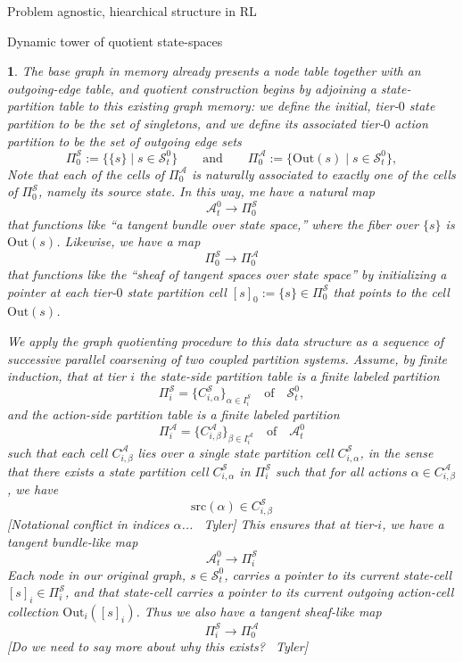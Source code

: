 \documentclass[11pt]{article}
\newtheorem{ermark}[subsubsection]{}
\begin{document}
\begin{section}{Problem agnostic, hiearchical structure in RL}
\begin{subsection}{Dynamic tower of quotient state-spaces}
\begin{ermark}
The base graph in memory already presents a node table together with an outgoing-edge table, and quotient construction begins by adjoining a state-partition table to this existing graph memory: we define the initial, {\em tier-}$0$ {\em state partition} to be the set of singletons, and we define its  associated {\em tier-}$0$ {\em action partition} to be the set of outgoing edge sets 
$$
\Pi_0^{\mathcal S}:=\bigl\{\{s\}\mid s\in\mathcal{S}_t^0\bigr\}
\qquad\text{and}\qquad
\Pi_0^{\mathcal A}:=\bigl\{\text{Out}(s)\mid s\in\mathcal{S}_t^0\bigr\},
$$
Note that each of the cells of $\Pi_0^{\mathcal A}$ is naturally associated to exactly one of the cells of $\Pi_0^{\mathcal S}$, namely its source state. In this way, me have a natural map
$$
\mathcal{A}^{0}_{t}\longrightarrow\Pi_0^{\mathcal S}
$$
that functions like ``a tangent bundle over state space,'' where the fiber over $\{s\}$ is $\text{Out}(s)$. Likewise, we have a map
$$
\Pi_0^{\mathcal S}\longrightarrow\Pi_0^{\mathcal A}
$$
that functions like the ``sheaf of tangent spaces over state space'' by  initializing a pointer at each tier-$0$ state partition cell $[s]_{0}:=\{s\}\in\Pi_0^{\mathcal S}$ that points to the cell $\text{Out}(s)$.

We apply the graph quotienting procedure to this data structure as a sequence of successive parallel coarsening of two coupled partition systems. Assume, by finite induction, that at tier $i$ the \emph{state-side partition table} is a finite labeled partition
\[
\Pi_i^{\mathcal S}=\{C_{i,\alpha}^{\mathcal S}\}_{\alpha\in I_i^{\mathcal S}}
\quad\text{of}\quad\mathcal{S}_t^0,
\]
and the \emph{action-side partition table} is a finite labeled partition
\[
\Pi_i^{\mathcal A}=\{C_{i,\beta}^{\mathcal A}\}_{\beta\in I_i^{\mathcal A}}
\quad\text{of}\quad\mathcal{A}_t^0
\]
such that each cell $C_{i,\beta}^{\mathcal A}$ lies over a single state partition cell $C_{i,\alpha}^{\mathcal S}$, in the sense that there exists a state partition cell $C_{i,\alpha}^{\mathcal S}$ in $\Pi_i^{\mathcal S}$ such that for all actions $\alpha\in C_{i,\beta}^{\mathcal A}$, we have
	$$
	\text{src}(\alpha)\in C_{i,\beta}^{\mathcal S}
	$$
{\color{blue} [Notational conflict in indices $\alpha$... \textemdash\ Tyler]} This ensures that at tier-$i$, we have a tangent bundle-like map 
$$
\mathcal{A}^{0}_{t}\longrightarrow\Pi_i^{\mathcal S}
$$
Each node in our original graph, $s\in\mathcal{S}_t^0$, carries a pointer to its current state-cell $[s]_i\in\Pi_i^{\mathcal S}$, and that state-cell carries a pointer to its current outgoing action-cell collection $\mathrm{Out}_i([s]_i)$. Thus we also have a tangent sheaf-like map
$$
\Pi_i^{\mathcal S}\longrightarrow\Pi_0^{\mathcal A}
$$
{\color{blue} [Do we need to say more about why this exists? \textemdash\ Tyler]}


\end{ermark}
\end{subsection}
\end{section}
\end{document}
